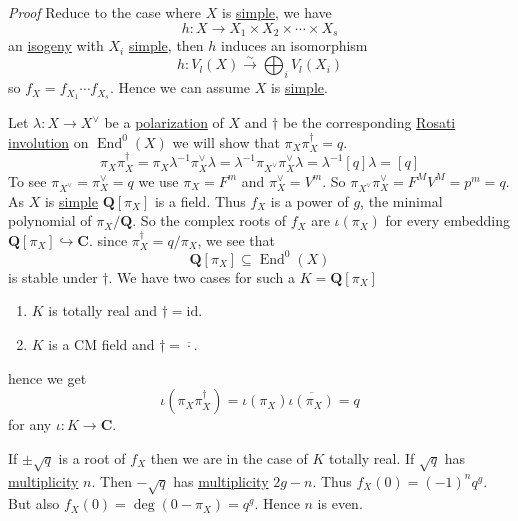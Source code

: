 \documentclass[10pt,]{book}
\makeatletter
\renewcommand*{\proofname}{Proof}
\renewenvironment{proof}[1][\proofname]{\par
  \pushQED{\qed}%
  \normalfont \topsep6\p@\@plus6\p@\relax
  \trivlist
  \item\relax
    {\itshape
    #1\@addpunct{.}}\hspace\labelsep\ignorespaces
}{%
  \popQED\endtrivlist\@endpefalse
}
\numberwithin{equation}{section}
\newcommand{\lb}{[}
\newcommand{\rb}{]}
\newcommand{\QQ}{\mathbf{Q}}
\newcommand{\CC}{\mathbf{C}}
\newcommand{\id}{\mathrm{id}}
\DeclareMathOperator{\End}{End}
\makeatother
\begin{document}
\begin{proof}\hypertarget{proof-62}{}
\hypertarget{p-368}{}%
Reduce to the case where \(X\) is \hyperref[def-simple-av]{simple}, we have%
\begin{equation*}
h\colon X\to X_1 \times X_2 \times \cdots \times X_s
\end{equation*}
an \hyperref[def-supersing-isog-isog]{isogeny} with \(X_i\) \hyperref[def-simple-av]{simple}, then \(h\) induces an isomorphism%
\begin{equation*}
h\colon V_l(X)\xrightarrow{\sim} \bigoplus_i V_l(X_i)
\end{equation*}
so \(f_X = f_{X_1} \cdots f_{X_s}\). Hence we can assume \(X\) is \hyperref[def-simple-av]{simple}.%
\par
\hypertarget{p-369}{}%
Let \(\lambda \colon X \to X^\vee\) be a \hyperref[def-polarization]{polarization} of \(X\) and \(\dagger\) be the corresponding \hyperref[sec-rosati]{Rosati involution} on \(\End^0(X)\) we will show that \(\pi_X\pi_X^\dagger = q\).%
\begin{equation*}
\pi_X \pi_X^\dagger = \pi_X \lambda^{-1} \pi_X^\vee \lambda = \lambda^{-1} \pi_{X^\vee} \pi_X^\vee \lambda = \lambda^{-1} \lb q \rb \lambda = \lb q \rb
\end{equation*}
To see \(\pi_{X^\vee} = \pi_X^\vee = q\) we use \(\pi_X = F^m\) and \(\pi_X^\vee = V^m \). So \(\pi_{X^\vee} \pi_X^\vee = F^MV^M = p^m = q\). As \(X\) is \hyperref[def-simple-av]{simple} \(\QQ\lb \pi_X\rb\) is a field. Thus \(f_X\) is a power of \(g\), the minimal polynomial of \(\pi_X/\QQ\). So the complex roots of \(f_X\) are \(\iota(\pi_X)\)  for every embedding \(\QQ\lb \pi_X\rb\hookrightarrow \CC\). since \(\pi_X^\dagger = q/ \pi_X\), we see that%
\begin{equation*}
\QQ[\pi_X] \subseteq \End^0(X)
\end{equation*}
is stable under \(\dagger\). We have two cases for such a \(K = \QQ\lb \pi_X \rb \)\leavevmode%
\begin{enumerate}
\item\hypertarget{li-64}{}\(K\) is  totally real and \(\dagger = \id\).%
\item\hypertarget{li-65}{}\(K\) is a CM field and \(\dagger = \overline{\cdot}\).%
\end{enumerate}
hence we get%
\begin{equation*}
\iota(\pi_X\pi_X^\dagger) = \iota(\pi_X) \overline{\iota(\pi_X)} = q
\end{equation*}
for any \(\iota\colon K \to \CC\).%
\par
\hypertarget{p-370}{}%
If \(\pm \sqrt q\) is  a root  of  \(f_X\) then we are in the case of \(K\) totally real. If \(\sqrt q\) has \hyperref[def-riem-order-vanish]{multiplicity} \(n\). Then \(-\sqrt q\) has \hyperref[def-riem-order-vanish]{multiplicity} \(2g-n\). Thus \(f_X(0) = (-1)^n   q^g\). But also \(f_X(0 ) = \deg(0 - \pi_X) = q^g\). Hence \(n \) is even.%
\end{proof}
%
%
\typeout{************************************************}
\typeout{************************************************}
%
\end{document}
